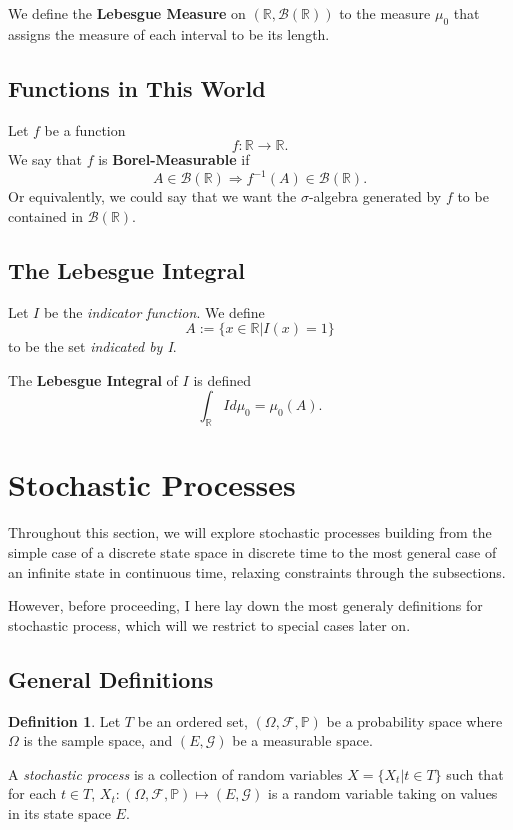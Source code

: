 \documentclass[12pt]{article}
\theoremstyle{plain}
\theoremstyle{definition}
\newtheorem{defn}[thm]{Definition}
\theoremstyle{remark}
\begin{document}
We define the \textbf{Lebesgue Measure} on $(\mathbb{R}, \mathcal{B}(\mathbb{R}))$ to the measure $\mu_0$ that assigns the measure of
each interval to be its length.

\subsection{Functions in This World}

Let $f$ be a function
\[ f: \mathbb{R} \rightarrow \mathbb{R}. \]
We say that $f$ is \textbf{Borel-Measurable} if
\[ A \in \mathcal{B}(\mathbb{R}) \Rightarrow f^{-1}(A) \in \mathcal{B}(\mathbb{R}). \]
Or equivalently, we could say that we want the $\sigma$-algebra generated by $f$ to be contained in $\mathcal{B}(\mathbb{R})$.

\subsection{The Lebesgue Integral}

Let $I$ be the \emph{indicator function}.  We define
\[ A := \{ x \in \mathbb{R}| I(x) =1 \} \]
to be the set \emph{indicated by I}.

The \textbf{Lebesgue Integral} of $I$ is defined
\[ \int_{\mathbb{R}} I d\mu_0 = \mu_0(A). \]


\section{Stochastic Processes}

Throughout this section, we will explore stochastic processes building
from the simple case of a discrete state space in discrete time to the
most general case of an infinite state in continuous time, relaxing constraints through the subsections.

However, before proceeding, I here lay down the most generaly
definitions for stochastic process, which will we restrict to special
cases later on.

\subsection{General Definitions}

\begin{defn}{\citep{pavliotis}}
Let $T$ be an ordered set, $(\Omega,\mathscr{F},\mathbb{P})$ be a
probability space where $\Omega$ is the sample space, and
$(E,\mathscr{G})$ be a measurable space.

A \emph{stochastic process} is a collection of random variables $X =
\{X_t | t\in T\}$ such that for each $t\in T$, $X_t:
(\Omega,\mathscr{F},\mathbb{P})\mapsto (E,\mathscr{G})$ is a random
variable taking on values in its state space $E$.
\end{defn}
\end{document}
